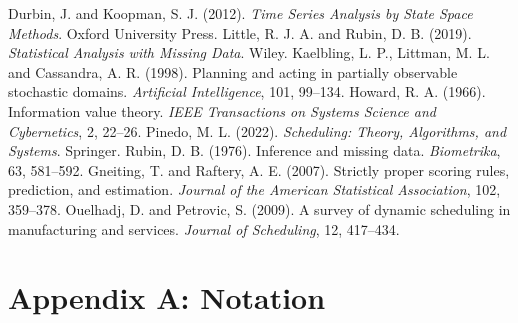 \documentclass{swmcmthesis}
\begin{document}
\begin{thebibliography}{\slotBibWidth}
\small
\setlength{\itemsep}{0pt}\setlength{\parskip}{0pt}
 Durbin, J. and Koopman, S. J. (2012). \emph{Time Series
Analysis by State Space Methods}. Oxford University Press.
 Little, R. J. A. and Rubin, D. B. (2019). \emph{Statistical
Analysis with Missing Data}. Wiley.
 Kaelbling, L. P., Littman, M. L. and Cassandra, A. R.
(1998). Planning and acting in partially observable stochastic domains.
\emph{Artificial Intelligence}, 101, 99--134.
 Howard, R. A. (1966). Information value theory. \emph{IEEE
Transactions on Systems Science and Cybernetics}, 2, 22--26.
 Pinedo, M. L. (2022). \emph{Scheduling: Theory, Algorithms,
and Systems}. Springer.
 Rubin, D. B. (1976). Inference and missing data.
\emph{Biometrika}, 63, 581--592.
 Gneiting, T. and Raftery, A. E. (2007). Strictly proper
scoring rules, prediction, and estimation. \emph{Journal of the American
Statistical Association}, 102, 359--378.
 Ouelhadj, D. and Petrovic, S. (2009). A survey of dynamic
scheduling in manufacturing and services. \emph{Journal of Scheduling}, 12,
417--434.
\end{thebibliography}

\label{BodyLastPage}
\clearpage
{}

\section*{Appendix A: Notation}
\end{document}
